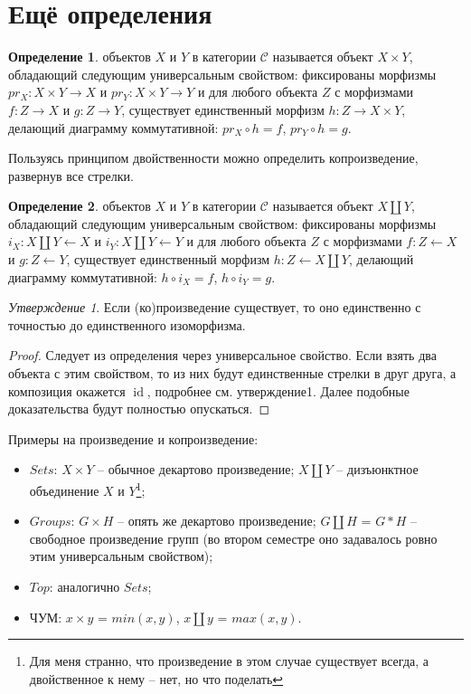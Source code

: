 \documentclass[a4paper]{article}
\theoremstyle{indented}
\theoremstyle{definition}
\newtheorem{defn}{Определение}
\theoremstyle{remark}
\newtheorem{stat}{Утверждение}
\DeclareMathOperator{\id}{id}
\begin{document}
\section{Ещё определения}
\begin{defn}
     объектов $X$ и $Y$ в категории $\mathcal{C}$ называется объект $X\times Y$, обладающий следующим универсальным свойством: фиксированы морфизмы $pr_{X}: X\times Y\rightarrow X$ и $pr_{Y}: X\times Y\rightarrow Y$ и для любого объекта $Z$ с морфизмами $f: Z\rightarrow X$ и $g: Z\rightarrow Y$, существует единственный морфизм $h: Z\rightarrow X\times Y$, делающий диаграмму коммутативной: $pr_{X} \circ  h = f$, $pr_{Y} \circ  h = g$.
\end{defn}
Пользуясь принципом двойственности можно определить копроизведение, развернув все стрелки.
\begin{defn}
     объектов $X$ и $Y$ в категории $\mathcal{C}$ называется объект $X\amalg Y$, обладающий следующим универсальным свойством: фиксированы морфизмы $i_{X}: X\amalg Y\leftarrow X$ и $i_{Y}: X\amalg Y\leftarrow Y$ и для любого объекта $Z$ с морфизмами $f: Z\leftarrow X$ и $g: Z\leftarrow Y$, существует единственный морфизм $h: Z\leftarrow X\amalg Y$, делающий диаграмму коммутативной: $h \circ  i_{X} = f$, $h \circ  i_{Y} = g$.
\end{defn}
\begin{stat}
    Если (ко)произведение существует, то оно единственно с точностью до единственного изоморфизма.
\end{stat}
\begin{proof}
    Следует из определения через универсальное свойство. Если взять два объекта с этим свойством, то из них будут единственные стрелки в друг друга, а композиция окажется $\id$, подробнее см. утверждение1. Далее подобные доказательства будут полностью опускаться.
\end{proof}
Примеры на произведение и копроизведение:
\begin{itemize}
    \item $Sets$: $X\times Y$ -- обычное декартово произведение; $X\amalg Y$ -- дизъюнктное объединение $X$ и $Y$\footnote{Для меня странно, что произведение в этом случае существует всегда, а двойственное к нему -- нет, но что поделать};
    \item $Groups$: $G\times H$ -- опять же декартово произведение; $G\amalg H$ = $G\ast H$ -- свободное произведение групп (во втором семестре оно задавалось ровно этим универсальным свойством);
    \item $Top$: аналогично $Sets$;
    \item ЧУМ: $x\times y$ = $min(x, y)$, $x\amalg y$ = $max(x, y)$.
\end{itemize}
\end{document}
